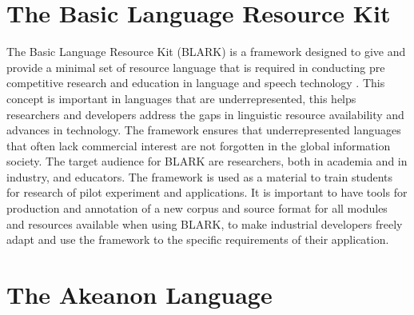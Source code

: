 \section{The Basic Language Resource Kit}
\label{sec: BLARK}
The Basic Language Resource Kit (BLARK) is a framework designed to give and provide a minimal set of resource language that is required in conducting pre competitive research and education in language and speech technology . This concept is important in languages that are underrepresented, this helps researchers and developers address the gaps in linguistic resource availability and advances in technology. The framework ensures that underrepresented languages that often lack commercial interest are not forgotten in the global information society. 
The target audience for BLARK are researchers, both in academia and in industry, and educators. The framework is used as a material to train students for research of pilot experiment and applications. It is important to have tools for production and annotation of a new corpus and source format for all modules and resources available when using BLARK, to make industrial developers freely adapt and use the framework to the specific requirements of their application.

\section{The Akeanon Language}
\label{sec:AkeanonLanguage}
